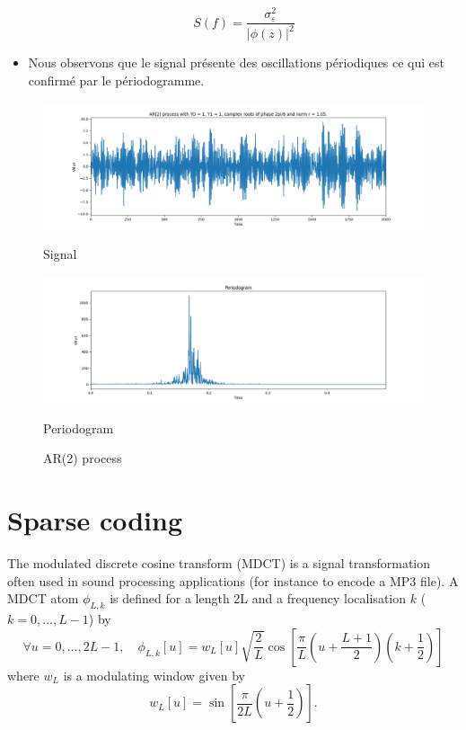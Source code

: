 \documentclass[11pt]{article}
\begin{document}
\begin{solution}
\begin{itemize}
        $$S(f) = \dfrac{\sigma_{\varepsilon}^2}{|\phi(z)|^2}$$
        \item Nous observons que le signal présente des oscillations périodiques ce qui est confirmé par le périodogramme.
    \end{itemize}

\begin{figure}
    \centering
    \begin{minipage}[t]{0.45\textwidth}
    \centerline{\includegraphics[width=\textwidth]{imgs/ar_process.png}}
    \centerline{Signal}
    \end{minipage}
    \hfill
    \begin{minipage}[t]{0.45\textwidth}    \centerline{\includegraphics[width=\textwidth]{imgs/periodogram.png}}
    \centerline{Periodogram}
    \end{minipage}
    \caption{AR(2) process}\label{fig:q-ar-2}
\end{figure}

\end{solution}

\newpage
\section{Sparse coding}

The modulated discrete cosine transform (MDCT) is a signal transformation often used in sound processing applications (for instance to encode a MP3 file).
A MDCT atom $\phi_{L,k}$ is defined for a length 2L and a frequency localisation $k$ ($k=0,\dots,L-1$) by
\begin{equation}
\forall u=0,\dots,2L-1,\quad\phi_{L,k}[u]=w_{L}[u]\sqrt{\frac{2}{L}} \cos [ \frac{\pi}{L} \left(u+ \frac{L+1}{2}\right) (k+\frac{1}{2}) ]
\end{equation}
where $w_{L}$ is a modulating window given by
\begin{equation}
w_L[u] = \sin \left[{\frac {\pi }{2L}}\left(u+{\frac {1}{2}}\right)\right].
\end{equation}
\end{document}
